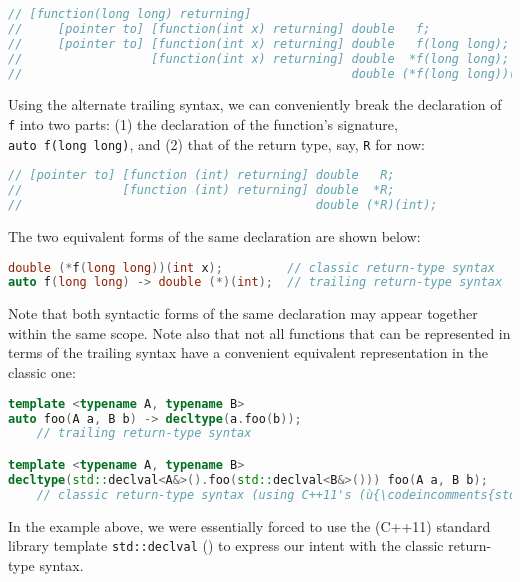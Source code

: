 \begin{lstlisting}[language=C++]
// [function(long long) returning]
//     [pointer to] [function(int x) returning] double   f;
//     [pointer to] [function(int x) returning] double   f(long long);
//                  [function(int x) returning] double  *f(long long);
//                                              double (*f(long long))(int x);
\end{lstlisting}
    
\noindent Using the alternate trailing syntax, we can conveniently break the
declaration of \lstinline!f! into two parts: (1) the declaration of the
function's signature, \lstinline!auto!~\lstinline!f(long!~\lstinline!long)!, and (2) that of the return type, say, \lstinline!R! for now:

\begin{lstlisting}[language=C++]
// [pointer to] [function (int) returning] double   R;
//              [function (int) returning] double  *R;
//                                         double (*R)(int);
\end{lstlisting}
    
\noindent The two equivalent forms of the same declaration are shown below:

\begin{lstlisting}[language=C++]
double (*f(long long))(int x);         // classic return-type syntax
auto f(long long) -> double (*)(int);  // trailing return-type syntax
\end{lstlisting}
    
\noindent Note that both syntactic forms of the same declaration may appear
together within the same scope. Note also that not all functions that
can be represented in terms of the trailing syntax have a convenient
equivalent representation in the classic one:

\begin{lstlisting}[language=C++]
template <typename A, typename B>
auto foo(A a, B b) -> decltype(a.foo(b));
    // trailing return-type syntax

template <typename A, typename B>
decltype(std::declval<A&>().foo(std::declval<B&>())) foo(A a, B b);
    // classic return-type syntax (using C++11's (ù{\codeincomments{std::declval}}ù))
\end{lstlisting}
    
\noindent In the example above, we were essentially forced to use the (C++11)
standard library template \lstinline!std::declval!
(\cite{cpprefdeclval}) to express our intent with the classic
return-type syntax.

